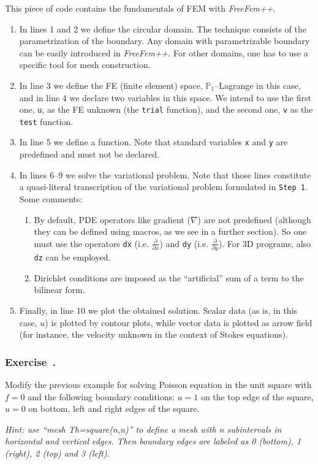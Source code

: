 \documentclass[12pt]{article}
\newcommand{\FF}{\textit{FreeFem++}\xspace}
\renewcommand{\P}{\mathbb{P}_}
\newcounter{exercise}
\newenvironment{exercise}{%
  \stepcounter{exercise}
  \subsubsection*{Exercise~\theexercise.}}
{}
\begin{document}
This piece of code contains the fundamentals of FEM with \FF.
\begin{enumerate}
\item In lines 1 and 2 we define the circular domain. The technique
  consists of the parametrization of the boundary. Any domain with
  parametrizable boundary can be easily introduced in \FF.  For other
  domains, one has to use a specific tool for mesh construction.
\item In line 3 we define the FE (finite element) space,
  $\P1$--Lagrange in this case, and in line 4 we declare two variables
  in this space. We intend to use the first one, \texttt{u}, as the FE
  unknown (the \texttt{trial} function), and the second one, \texttt{v}
  as the \texttt{test} function.
\item In line 5 we define a function. Note that standard variables
  \texttt{x} and \texttt{y} are predefined and must not be declared.
\item In lines 6--9 we solve the variational problem. Note that those
  lines constitute a quasi-literal transcription of the variational
  problem formulated in \texttt{Step 1}. Some comments:
  \begin{enumerate}
  \item By default, PDE operators like gradient ($\nabla$) are not
    predefined (although they can be defined using macros, as we see
    in a further section). So one must use the operators \texttt{dx}
    (i.e. $\frac{\partial}{\partial x}$) and \texttt{dy}
    (i.e. $\frac{\partial}{\partial y}$). For 3D programs, also \texttt{dz}
    can be employed.
  \item Dirichlet conditions are imposed as the ``artificial'' sum of
    a term to the bilinear form.
  \end{enumerate}

\item Finally, in line 10 we plot the obtained solution. Scalar data
  (as is, in this case, $u$) is plotted by contour plots, while vector
  data is plotted as arrow field (for instance, the velocity unknown
  in the context of Stokes equations).
\end{enumerate}

\begin{exercise}
  Modify the previous example for solving Poisson equation in the unit
  square with $f=0$ and the following boundary conditions: $u=1$ on
  the top edge of the square, $u=0$ on bottom, left and right edges of
  the square.

  \emph{Hint: use ``mesh Th=square(n,n)'' to define a mesh with n
    subintervals in horizontal and vertical edges. Then boundary edges
    are labeled as 0 (bottom), 1 (right), 2 (top) and 3 (left)}.
\end{exercise}
\end{document}
